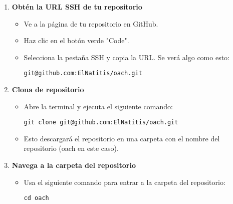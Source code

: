 \documentclass[10pt,a4paper]{book}
\begin{document}
\begin{enumerate}
	\item \textbf{Obtén la URL SSH de tu repositorio}
	\begin{itemize}
		\item Ve a la página de tu repositorio en GitHub.

		\item Haz clic en el botón verde "Code".

		\item Selecciona la pestaña SSH y copia la URL. Se verá algo como esto:
		\begin{lstlisting}
git@github.com:ElNatitis/oach.git
		\end{lstlisting}
	\end{itemize}
	\item \textbf{Clona de repositorio}
	\begin{itemize}
		\item Abre la terminal y ejecuta el siguiente comando:
		\begin{lstlisting}
git clone git@github.com:ElNatitis/oach.git
		\end{lstlisting}
		\item Esto descargará el repositorio en una carpeta con el nombre del repositorio (oach en este caso).
	\end{itemize}
	\item \textbf{Navega a la carpeta del repositorio}
	\begin{itemize}
		\item Usa el siguiente comando para entrar a la carpeta del repositorio:
		\begin{lstlisting}
cd oach
		\end{lstlisting}
	\end{itemize}
\end{enumerate}
\end{document}
